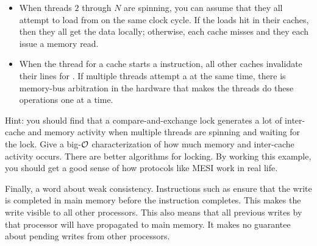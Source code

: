 \documentclass{article}
\begin{document}
\begin{enumerate}
\begin{itemize}
{                        just writing the value we read if the compare-and-exchange fails.
                        I'm sure there are many other variations, and they've probably all been
                        studied by those who have dedicated their careers to cache design.}
                    While the cache is in state , it signals a stall to any other cache that requests the cache line
                    through a memory read or write.  The operation is delayed until the cache line moves to state  or ,
                    and then the operation is handled according to the usual MESI protocol.
                    There are many ways we could optimize this protocol, but I want to keep it simple.
              \item When threads $2$ through $N$ are spinning, you can assume that they all attempt to load from
                     on the same clock cycle.  If the loads hit in their caches, then they all get the
                    data locally; otherwise, each cache misses and they each issue a memory read.
              \item When the thread for a cache starts a  instruction, all other caches invalidate their
                    lines for .  If multiple threads attempt a  at the same time,
                    there is memory-bus arbitration in the hardware that makes the threads do these operations one at a time.
          \end{itemize}
          Hint: you should find that a compare-and-exchange lock generates a lot of inter-cache and memory activity
          when multiple threads are spinning and waiting for the lock.  Give a big-$\mathcal{O}$ characterization of how
          much memory and inter-cache activity occurs.  There are better algorithms for locking.  By working this
          example, you should get a good sense of how protocols like MESI work in real life.

          Finally, a word about weak consistency.  Instructions such as  ensure that the write is
          completed in main memory before the instruction completes.  This makes the write visible to all other
          processors.  This also means that all previous writes by that processor will have propagated to main
          memory.  It makes no guarantee about pending writes from other processors.



\end{enumerate}
\end{document}
